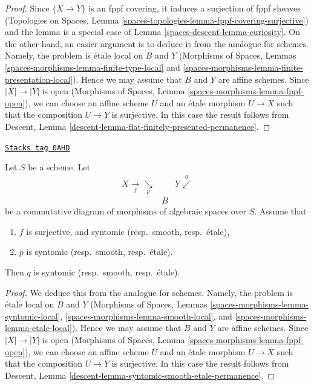 \begin{proof}
Since $\{X \to Y\}$ is an fppf covering, it induces a surjection of
fppf sheaves (Topologies on Spaces, Lemma
\ref{spaces-topologies-lemma-fppf-covering-surjective}) and the
lemma is a special case of Lemma \ref{spaces-descent-lemma-curiosity}.
On the other hand, an easier argument is to deduce it from
the analogue for schemes. Namely, the problem is \'etale local
on $B$ and $Y$ (Morphisms of Spaces, Lemmas
\ref{spaces-morphisms-lemma-finite-type-local} and
\ref{spaces-morphisms-lemma-finite-presentation-local}).
Hence we may assume that $B$ and $Y$ are affine
schemes. Since $|X| \to |Y|$ is open
(Morphisms of Spaces, Lemma \ref{spaces-morphisms-lemma-fppf-open}),
we can choose an affine
scheme $U$ and an \'etale morphism $U \to X$ such that the
composition $U \to Y$ is surjective. In this case the result
follows from Descent, Lemma
\ref{descent-lemma-flat-finitely-presented-permanence}.
\end{proof}

\begin{lemma}
\label{spaces-descent-lemma-syntomic-smooth-etale-permanence}
\href{https://stacks.math.columbia.edu/tag/0AHD}{\texttt{Stacks tag 0AHD}}

Let $S$ be a scheme. Let
$$
\begin{array}{ccc}X \underset{f}{\longrightarrow}\underset{p}{\searrow} &  & Y \overset{q}{\swarrow} \\  & B & \end{array}
$$
be a commutative diagram of morphisms of algebraic spaces over $S$.
Assume that
\begin{enumerate}
\item $f$ is surjective, and syntomic (resp.\ smooth, resp.\ \'etale),
\item $p$ is syntomic (resp.\ smooth, resp.\ \'etale).
\end{enumerate}
Then $q$ is syntomic (resp.\ smooth, resp.\ \'etale).
\end{lemma}

\begin{proof}
We deduce this from the analogue for schemes.
Namely, the problem is \'etale local on $B$ and $Y$
(Morphisms of Spaces, Lemmas
\ref{spaces-morphisms-lemma-syntomic-local},
\ref{spaces-morphisms-lemma-smooth-local}, and
\ref{spaces-morphisms-lemma-etale-local}).
Hence we may assume that $B$ and $Y$ are affine
schemes. Since $|X| \to |Y|$ is open
(Morphisms of Spaces, Lemma \ref{spaces-morphisms-lemma-fppf-open}),
we can choose an affine
scheme $U$ and an \'etale morphism $U \to X$ such that the
composition $U \to Y$ is surjective. In this case the result
follows from Descent, Lemma
\ref{descent-lemma-syntomic-smooth-etale-permanence}.
\end{proof}

